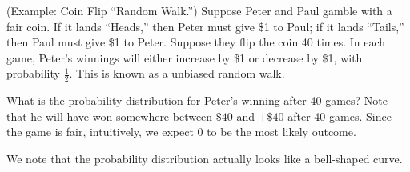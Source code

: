 \documentclass[letterpaper]{article}
\begin{document}
\begin{mdframed}[nobreak=true]
    (Example: Coin Flip ``Random Walk.'') Suppose Peter and Paul gamble with a fair coin. If it lands ``Heads,'' then Peter must give \$1 to Paul; if it lands ``Tails,'' then Paul must give \$1 to Peter. Suppose they flip the coin 40 times. In each game, Peter's winnings will either increase by \$1 or decrease by \$1, with probability $\frac{1}{2}$. This is known as a unbiased random walk. 

    \bigskip 

    What is the probability distribution for Peter's winning after 40 games? Note that he will have won somewhere between $\$40$ and $+\$40$ after 40 games. Since the game is fair, intuitively, we expect 0 to be the most likely outcome.  

    \bigskip 

    We note that the probability distribution actually looks like a bell-shaped curve.
\end{mdframed}
\end{document}
